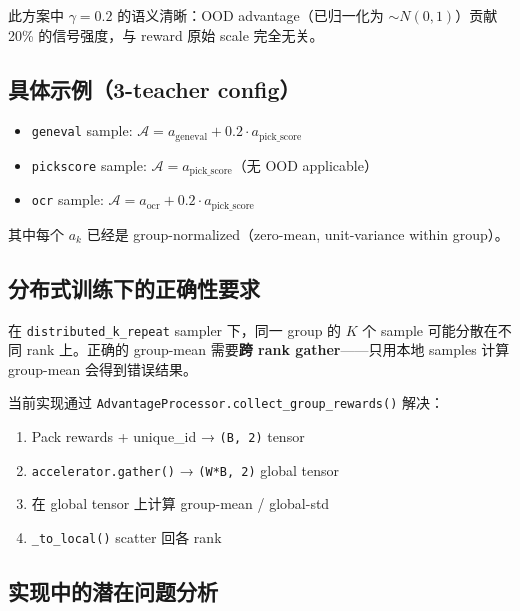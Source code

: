 \documentclass[11pt,a4paper]{article}
\theoremstyle{definition}
\begin{document}
此方案中 $\gamma = 0.2$ 的语义清晰：OOD advantage（已归一化为 $\sim N(0,1)$）贡献 20\% 的信号强度，与 reward 原始 scale 完全无关。

\subsection{具体示例（3-teacher config）}

\begin{itemize}[leftmargin=1.5em]
\item \texttt{geneval} sample: $\mathcal{A} = a_{\mathrm{geneval}} + 0.2 \cdot a_{\mathrm{pick\_score}}$
\item \texttt{pickscore} sample: $\mathcal{A} = a_{\mathrm{pick\_score}}$（无 OOD applicable）
\item \texttt{ocr} sample: $\mathcal{A} = a_{\mathrm{ocr}} + 0.2 \cdot a_{\mathrm{pick\_score}}$
\end{itemize}

其中每个 $a_k$ 已经是 group-normalized（zero-mean, unit-variance within group）。

\subsection{分布式训练下的正确性要求}

\begin{tcolorbox}[colback=red!5, colframe=red!50, title=关键约束]
在 \texttt{distributed\_k\_repeat} sampler 下，同一 group 的 $K$ 个 sample 可能分散在不同 rank 上。正确的 group-mean 需要\textbf{跨 rank gather}——只用本地 samples 计算 group-mean 会得到错误结果。

当前实现通过 \texttt{AdvantageProcessor.collect\_group\_rewards()} 解决：
\begin{enumerate}[leftmargin=1.5em]
\item Pack rewards + unique\_id → \texttt{(B, 2)} tensor
\item \texttt{accelerator.gather()} → \texttt{(W*B, 2)} global tensor
\item 在 global tensor 上计算 group-mean / global-std
\item \texttt{\_to\_local()} scatter 回各 rank
\end{enumerate}
\end{tcolorbox}

\subsection{实现中的潜在问题分析}
\end{document}
